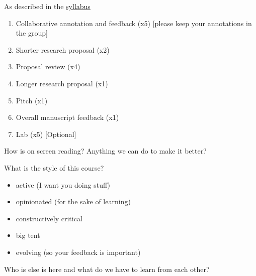 \documentclass{beamer}
\begin{document}
\begin{frame}

As described in the \textcolor{blue}{\href{http://www.princeton.edu/~mjs3/soc596_f2016/}{syllabus}}

\begin{enumerate}
\item Collaborative annotation and feedback (x5) [please keep your annotations in the group]
\pause
\item Shorter research proposal (x2)
\pause 
\item Proposal review (x4)
\pause
\item Longer research proposal (x1)
\pause
\item Pitch (x1)
\pause
\item Overall manuscript feedback (x1)
\pause
\item Lab (x5) [Optional]
\end{enumerate}

\end{frame}
\begin{frame}

\begin{center}
\LARGE{How is on screen reading?  Anything we can do to make it better?}
\end{center}

\end{frame}
\begin{frame}

\begin{center}
\LARGE{What is the style of this course?}
\end{center}

\end{frame}
\begin{frame}

\begin{itemize}
\item active (I want you doing stuff)
\pause
\item opinionated (for the sake of learning)
\pause
\item constructively critical
\pause
\item big tent
\pause
\item evolving (so your feedback is important)
\end{itemize}

\end{frame}
\begin{frame}

\begin{center}
\LARGE{Who is else is here and what do we have to learn from each other?}
\end{center}

\end{frame}
\end{document}
